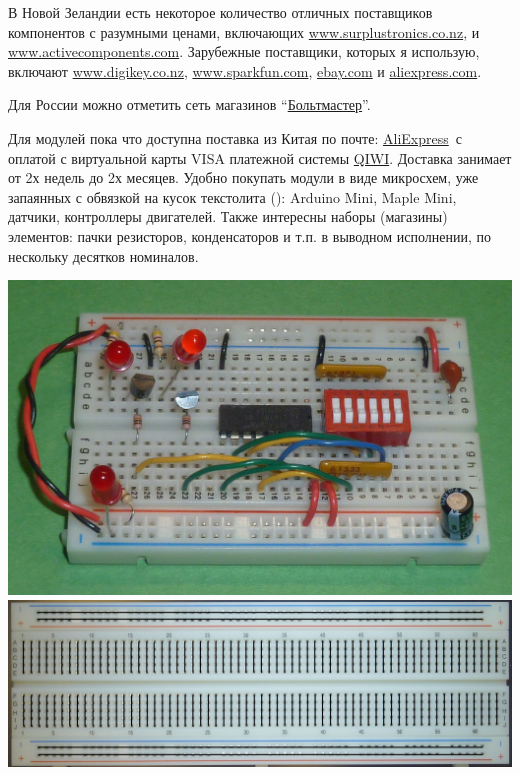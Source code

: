 
\secdown


В Новой Зеландии есть некоторое количество отличных поставщиков компонентов с
разумными ценами, включающих \url{www.surplustronics.co.nz}, и
\url{www.activecomponents.com}. Зарубежные поставщики, которых я использую,
включают \url{www.digikey.co.nz}, \url{www.sparkfun.com}, \url{ebay.com}
и \url{aliexpress.com}.

\bigskip
Для России можно отметить сеть магазинов
``\href{http://voltmaster.ru/}{Больтмастер}''.

\bigskip
Для модулей пока что доступна поставка из Китая по почте:
\href{http://www.aliexpress.com/}{AliExpress}\ с оплатой с виртуальной карты
VISA платежной системы \href{https://qiwi.ru/}{QIWI}. Доставка занимает от 2х
недель до 2х месяцев. Удобно покупать модули в виде микросхем, уже запаянных с
обвязкой на кусок текстолита (): Arduino Mini, Maple Mini,
датчики, контроллеры двигателей. Также интересны наборы (магазины) элементов:
пачки резисторов, конденсаторов и т.п. в выводном исполнении, по нескольку
десятков номиналов.


\noindent
\includegraphics[height=0.3\textheight]{bcollis/breadboard2.jpg}
\includegraphics[height=0.3\textheight]{bcollis/BreadboardConnections.jpg}
\bigskip

